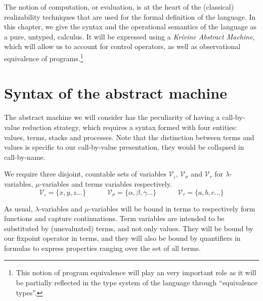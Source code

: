 The notion of computation, or evaluation, is at the heart of the (classical)
realizability techniques that are used for the formal definition of the \pml
language. In this chapter, we give the syntax and the operational semantics
of the language as a pure, untyped, calculus. It will be expressed using a
\emph{Krivine Abstract Machine}, which will allow us to account for control
operators, as well as observational equivalence of programs.\footnote{This
notion of program equivalence will play an very important role as it will be
partially reflected in the type system of the language through ``equivalence
types''.}

\section{Syntax of the abstract machine}

The abstract machine we will consider has the peculiarity of having a
call-by-value reduction strategy, which requires a syntax formed with four
entities: values, terms, stacks and processes. Note that the distinction
between terms and values is specific to our call-by-value presentation, they
would be collapsed in call-by-name.
\begin{definition}[variables]
  We require three disjoint, countable sets of variables $\mathcal{V}_{ι}$,
  $\mathcal{V}_{σ}$ and $\mathcal{V}_{τ}$ for $λ$-variables, $μ$-variables
  and terms variables respectively.
  $$
    \mathcal{V}_{ι} = \{x, y, z ...\}
    \quad\quad\quad
    \mathcal{V}_{σ} = \{α, β, γ ...\}
    \quad\quad\quad
    \mathcal{V}_{τ} = \{a, b, c ...\}
  $$
\end{definition}
As usual, $λ$-variables and $μ$-variables will be bound in terms to
respectively form functions and capture continuations. Term variables
are intended to be substituted by (unevaluated) terms, and not only
values. They will be bound by our fixpoint operator in terms, and they
will also be bound by quantifiers in formulas to express properties
ranging over the set of all terms.

